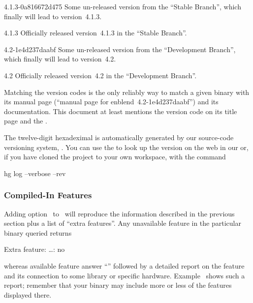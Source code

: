 \begin{codelist}
\item[4.1.3-0a816672d475]\itemend Some un-released version from the
  ``Stable Branch'', which finally will lead to version~4.1.3.

\item[4.1.3]\itemend Officially released version~4.1.3 in the ``Stable
  Branch''.

\item[4.2-1e4d237daabf]\itemend Some un-released version from the
  ``Development Branch'', which finally will lead to version~4.2.

\item[4.2]\itemend Officially released version~4.2 in the
  ``Development Branch''.
\end{codelist}

Matching the version codes is the only reliably way to match a given
binary with its manual page (``manual page for
enblend~4.2-1e4d237daabf'') and its documentation.  This document at
least mentions the version code on its title page and the
.

The twelve-digit hexadeximal  is automatically
generated by our source-code versioning system,
.  You can use the
 to look up the version on the web in our
 or, if you
have cloned the project to your own workspace, with the command
\begin{literal}
  hg log --verbose --rev 
\end{literal}


\subsubsection[Compiled-In Features]{Compiled-In Features
  \label{sec:compiled-in-features}
  }

Adding option~ to~ will reproduce
the information described in the previous section plus a list of
``extra features''.  Any unavailable feature in the particular
binary queried returns
\begin{literal}
  Extra feature: \dots: no
\end{literal}
whereas available feature answer ``'' followed by a detailed
report on the feature and its connection to some library or specific
hardware.  Example~ shows such a
report; remember that your binary may include more or less of the
features displayed there.

